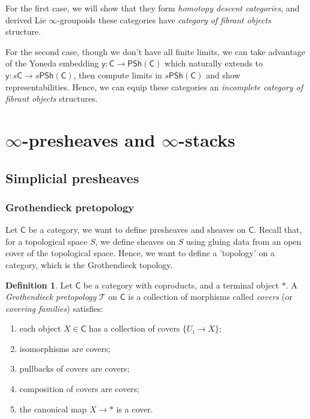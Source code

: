 \documentclass[12pt]{amsart}
\theoremstyle{definition}
\newtheorem{defn}[thm]{Definition}
\theoremstyle{remark}
\numberwithin{equation}{section}
\newcommand{\CC}{{\mathsf C}}
\newcommand{\1}{{\mathbb{1}}}
\newcommand{\y}{\mathsf{y}}
\newcommand{\psh}{\mathsf{PSh}}
\begin{document}
For the first case, we will show that they form {\it homotopy descent categories}, and derived Lie $\infty$-groupoids these categories have {\it category of fibrant objects} structure. 

For the second case, though we don't have all finite limits, we can take advantage of the Yoneda embedding $\y: \CC \to \psh(\CC)$ which naturally extends to $\y: s\CC \to s\psh(\CC)$, then compute limits in $s\psh(\CC)$ and show representabilities. Hence, we can equip these categories an {\it incomplete category of fibrant objects} structures.

\section{$\infty$-presheaves and $\infty$-stacks}
\subsection{Simplicial presheaves}



\subsubsection{Grothendieck pretopology}

Let $\CC$ be a category, we want to define presheaves and sheaves on $\CC$. Recall that, for a topological space $S$, we define sheaves on $S$ using gluing data from an open cover of the topological space. Hence, we want to define a 'topology' on a category, which is the Grothendieck topology.



\begin{defn}
	Let $\CC$ be a category with coproducts, and a terminal object $\ast$. A {\it Grothendieck pretopology} $\mathcal{T}$ on $\CC$ is a collection of morphisms called {\it covers} (or {\it  covering families}) satisfies:
	\begin{enumerate}
		\item each object $X\in \CC$ has a collection of covers $\{U_i\to X \}$;
		\item isomorphisms are covers;
		\item pullbacks of covers are covers;
		\item composition of covers are covers;
		\item the canonical map $X\to \ast $ is a cover.
	\end{enumerate}
	\end{defn}
\end{document}
